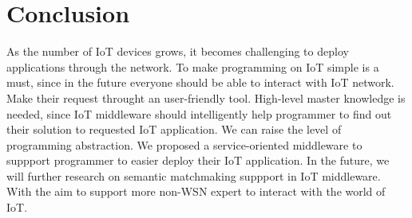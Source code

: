 \section{Conclusion}

As the number of IoT devices grows, it becomes challenging to deploy applications through the network. To make programming on IoT simple is a must, since in the future everyone should be able to interact with IoT network. Make their request throught an user-friendly tool. High-level master knowledge is needed, since IoT middleware should intelligently help programmer to find out their solution to requested IoT application. We can raise the level of programming abstraction. We proposed a service-oriented middleware to suppport programmer to easier deploy their IoT application. In the future, we will further research on semantic matchmaking suppport in IoT middleware. With the aim to support more non-WSN expert to interact with the world of IoT.  